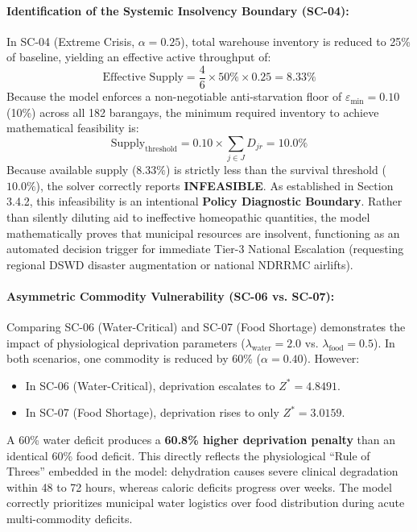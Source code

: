 \paragraph{Identification of the Systemic Insolvency Boundary (SC-04):} In SC-04 (Extreme Crisis, $\alpha = 0.25$), total warehouse inventory is reduced to 25\% of baseline, yielding an effective active throughput of:
$$\text{Effective Supply} = \frac{4}{6} \times 50\% \times 0.25 = 8.33\%$$
Because the model enforces a non-negotiable anti-starvation floor of $\varepsilon_{\min} = 0.10$ (10\%) across all 182 barangays, the minimum required inventory to achieve mathematical feasibility is:
$$\text{Supply}_{\text{threshold}} = 0.10 \times \sum_{j \in J} D_{jr} = 10.0\%$$
Because available supply ($8.33\%$) is strictly less than the survival threshold ($10.0\%$), the solver correctly reports \textbf{INFEASIBLE}. As established in Section 3.4.2, this infeasibility is an intentional \textbf{Policy Diagnostic Boundary}. Rather than silently diluting aid to ineffective homeopathic quantities, the model mathematically proves that municipal resources are insolvent, functioning as an automated decision trigger for immediate Tier-3 National Escalation (requesting regional DSWD disaster augmentation or national NDRRMC airlifts).

\paragraph{Asymmetric Commodity Vulnerability (SC-06 vs. SC-07):} Comparing SC-06 (Water-Critical) and SC-07 (Food Shortage) demonstrates the impact of physiological deprivation parameters ($\lambda_{\text{water}} = 2.0$ vs. $\lambda_{\text{food}} = 0.5$). In both scenarios, one commodity is reduced by 60\% ($\alpha = 0.40$). However:
\begin{itemize}
    \item In SC-06 (Water-Critical), deprivation escalates to $Z^* = \mathbf{4.8491}$.
    \item In SC-07 (Food Shortage), deprivation rises to only $Z^* = \mathbf{3.0159}$.
\end{itemize}
A 60\% water deficit produces a \textbf{60.8\% higher deprivation penalty} than an identical 60\% food deficit. This directly reflects the physiological ``Rule of Threes'' embedded in the model: dehydration causes severe clinical degradation within 48 to 72 hours, whereas caloric deficits progress over weeks. The model correctly prioritizes municipal water logistics over food distribution during acute multi-commodity deficits.

